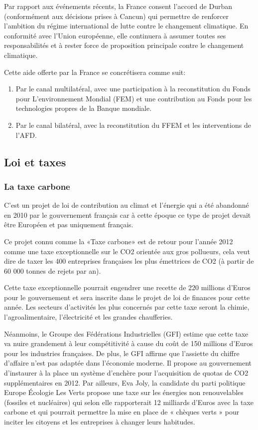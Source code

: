 \documentclass[a4paper,11pt]{article}
\begin{document}
Par rapport aux événements récents, la France consent l'accord de Durban (conformément aux décisions prises à Cancun) qui permettre de renforcer l’ambition du régime international de lutte contre le changement climatique. En conformité avec l’Union européenne, elle continuera à assumer toutes ses responsabilités et à rester force de proposition principale contre le changement climatique. 

Cette aide offerte par la France se concrétisera comme suit:
\begin{enumerate}
\item Par le canal multilatéral, avec une participation à la reconstitution du Fonds pour L'environnement Mondial (FEM) et une contribution au Fonds pour les technologies propres de la Banque mondiale.
\item Par le canal bilatéral, avec la reconstitution du FFEM et les interventions de l’AFD.
\end{enumerate}

\subsection{Loi et taxes}

\subsubsection{La taxe carbone}

C’est  un projet  de  loi  de contribution  au  climat et  l’énergie  qui a  été
abandonné en  2010 par le  gouvernement français car  à cette époque ce  type de
projet devait être Européen et pas uniquement français. 


Ce projet  connu comme la «Taxe carbone»  est de retour pour  l’année 2012 comme
une taxe exceptionnelle  sur le CO2 orientée aux gros  pollueurs, cela veut dire
de taxer les 400 entreprises françaises  les plus émettrices de CO2 (à partir de
60 000 tonnes de rejets par an). 


Cette taxe exceptionnelle pourrait engendrer une recette de 220 millions d’Euros
pour le  gouvernement et sera  inscrite dans le  projet de loi de  finances pour
cette année. Les  secteurs d’activités les plus concernés  par cette taxe seront
la chimie, l’agroalimentaire, l’électricité et les grandes chaufferies. 


Néanmoins, le Groupe des Fédérations Industrielles (GFI) estime que cette taxe va nuire grandement à leur compétitivité à cause du coût de 150 millions d’Euros pour les industries françaises. De plus, le GFI affirme que l’assiette du chiffre d’affaire n’est pas adaptée dans l’économie moderne. Il propose au gouvernement d’instaurer à la place un système d’enchère pour l’acquisition de quotas de CO2 supplémentaires en 2012.
Par  ailleurs, Eva Joly,  la candidate  du parti  politique Europe  Écologie Les
Verts  propose  une  taxe  sur  les  énergies  non  renouvelables  (fossiles  et
nucléaires)  qui selon  elle  rapporterait  12 milliards  d’Euros  avec la  taxe
carbone et  qui pourrait permettre la  mise en place  de « chèques verts  » pour
inciter les citoyens et les entreprises à changer leurs habitudes.
\end{document}
